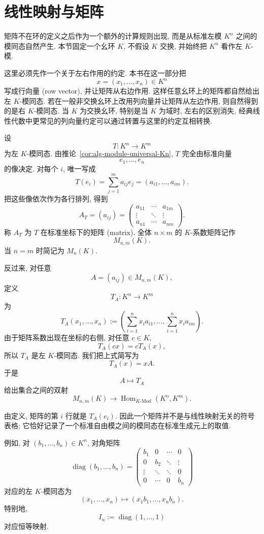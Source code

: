 \documentclass[usesamecnt, thmcnt=section, lang=cn, newtx, 10pt, scheme=chinese]{elegantbook}
\begin{document}
\section{线性映射与矩阵}

矩阵不在环的定义之后作为一个额外的计算规则出现, 而是从标准左模 $K^n$ 之间的模同态自然产生. 本节固定一个幺环 $K$, 不假设 $K$ 交换, 并始终把 $K^n$ 看作左 $K$-模.

这里必须先作一个关于左右作用的约定. 本书在这一部分把
\[
 x=(x_1,\ldots,x_n)\in K^n
\]
写成{\color{blue}行向量 (row vector)}, 并让矩阵从右边作用. 这样任意幺环上的矩阵都自然给出左 $K$-模同态. 若在一般非交换幺环上改用列向量并让矩阵从左边作用, 则自然得到的是右 $K$-模同态. 当 $K$ 为交换幺环, 特别是当 $K$ 为域时, 左右的区别消失, 经典线性代数中更常见的列向量约定可以通过转置与这里的约定互相转换.

\begin{definition}[左模同态的矩阵]\label{def:alg-matrix-linear-map}
设
\[
 T:K^n\longrightarrow K^m
\]
为左 $K$-模同态. 由推论~\ref{cor:alg-module-universal-Kn}, $T$ 完全由标准向量
\[
 e_1,\ldots,e_n
\]
的像决定. 对每个 $i$, 唯一写成
\[
 T(e_i)
 =\sum_{j=1}^m a_{ij}e_j
 =(a_{i1},\ldots,a_{im}).
\]
把这些像依次作为各行排列, 得到
\[
 A_T=(a_{ij})
 =
 \begin{pmatrix}
  a_{11}&\cdots&a_{1m}\\
  \vdots&\ddots&\vdots\\
  a_{n1}&\cdots&a_{nm}
 \end{pmatrix}.
\]
称 $A_T$ 为 $T$ 在标准坐标下的{\color{blue}矩阵 (matrix)}. 全体 $n\times m$ 的 $K$-系数矩阵记作
\[
 M_{n,m}(K).
\]
当 $n=m$ 时简记为 $M_n(K)$.

反过来, 对任意
\[
 A=(a_{ij})\in M_{n,m}(K),
\]
定义
\[
 T_A:K^n\longrightarrow K^m
\]
为
\[
 T_A(x_1,\ldots,x_n)
 :=
 \left(
  \sum_{i=1}^n x_i a_{i1},
  \ldots,
  \sum_{i=1}^n x_i a_{im}
 \right).
\]
由于矩阵系数出现在坐标的右侧, 对任意 $c\in K$,
\[
 T_A(cx)
 =cT_A(x),
\]
所以 $T_A$ 是左 $K$-模同态. 我们把上式简写为
\[
 T_A(x)=xA.
\]
于是
\[
 A\longmapsto T_A
\]
给出集合之间的双射
\[
 M_{n,m}(K)
 \longrightarrow
 \operatorname{Hom}_{K\text{-}\mathrm{Mod}}(K^n,K^m).
\]
\end{definition}

由定义, 矩阵的第 $i$ 行就是 $T_A(e_i)$. 因此一个矩阵并不是与线性映射无关的符号表格; 它恰好记录了一个标准自由模之间的模同态在标准生成元上的取值.

例如, 对 $(b_1,\ldots,b_n)\in K^n$, 对角矩阵
\[
 \operatorname{diag}(b_1,\ldots,b_n)
 =
 \begin{pmatrix}
  b_1&0&\cdots&0\\
  0&b_2&\ddots&\vdots\\
  \vdots&\ddots&\ddots&0\\
  0&\cdots&0&b_n
 \end{pmatrix}
\]
对应的左 $K$-模同态为
\[
 (x_1,\ldots,x_n)
 \longmapsto
 (x_1b_1,\ldots,x_nb_n).
\]
特别地,
\[
 I_n:=\operatorname{diag}(1,\ldots,1)
\]
对应恒等映射.
\end{document}
